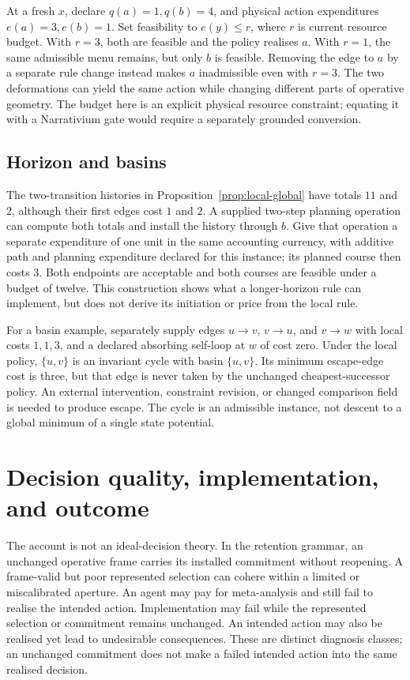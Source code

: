 \documentclass[11pt,a4paper]{article}
\theoremstyle{remark}
\begin{document}
At a fresh \(x\), declare \(q(a)=1,q(b)=4\), and physical action expenditures
\(e(a)=3,e(b)=1\). Set feasibility to \(e(y)\le r\), where \(r\) is current
resource budget. With \(r=3\), both are feasible and the policy realises \(a\).
With \(r=1\), the same admissible menu remains, but only \(b\) is feasible.
Removing the edge to \(a\) by a separate rule change instead makes \(a\)
inadmissible even with \(r=3\). The two deformations can yield the same action
while changing different parts of operative geometry. The budget here is an
explicit physical resource constraint; equating it with a Narrativium gate
would require a separately grounded conversion.

\subsection{Horizon and basins}

The two-transition histories in Proposition~\ref{prop:local-global} have
totals \(11\) and \(2\), although their first edges cost \(1\) and \(2\).
A supplied two-step planning operation can compute both totals and install
the history through \(b\). Give that operation a separate expenditure of one
unit in the same accounting currency, with additive path and planning
expenditure declared for this instance; its planned course then costs \(3\).
Both endpoints are acceptable and both courses are feasible under a budget
of twelve. This construction shows
what a longer-horizon rule can implement, but does not derive its initiation
or price from the local rule.

For a basin example, separately supply edges \(u\to v\), \(v\to u\), and
\(v\to w\) with local costs \(1,1,3\), and a declared absorbing self-loop at
\(w\) of cost zero. Under the local policy, \(\{u,v\}\) is an invariant cycle
with basin \(\{u,v\}\). Its minimum escape-edge cost is three, but that edge
is never taken by the unchanged cheapest-successor policy. An external
intervention, constraint revision, or changed comparison field is needed to
produce escape. The cycle is an admissible instance, not descent to a global
minimum of a single state potential.

\section{Decision quality, implementation, and outcome}\label{sec:quality}

The account is not an ideal-decision theory. In the retention grammar, an
unchanged operative frame carries its installed commitment without reopening.
A frame-valid but poor represented selection can cohere within a limited or
miscalibrated aperture. An agent may pay for meta-analysis and still fail to
realise the intended action. Implementation may fail while the represented
selection or commitment remains unchanged. An intended action may also be
realised yet lead to undesirable consequences. These are distinct diagnosis
classes; an unchanged commitment does not make a failed intended action into
the same realised decision.
\end{document}

